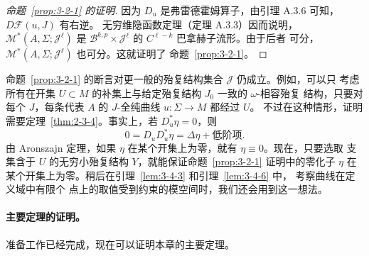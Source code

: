 \begin{proof}[命题~\ref{prop:3-2-1} 的证明]
因为 $D_u$ 是弗雷德霍姆算子，由引理 A.3.6 可知，$D\mathcal F(u,J)$ 有右逆。
无穷维隐函数定理（定理 A.3.3）因而说明，
$\mathcal M^*(A,\Sigma;\mathcal J^\ell)$ 是
$\mathcal B^{k,p}\times\mathcal J^\ell$ 的 $C^{\ell-k}$ 巴拿赫子流形。由于后者
可分，$\mathcal M^*(A,\Sigma;\mathcal J^\ell)$ 也可分。这就证明了
命题~\ref{prop:3-2-1}。
\end{proof}

\begin{remark}\label{rem:3-2-3}
命题~\ref{prop:3-2-1} 的断言对更一般的殆复结构集合 $\mathcal J$ 仍成立。例如，可以只
考虑所有在开集 $U\subset M$ 的补集上与给定殆复结构 $J_0$ 一致的 $\omega$-相容殆复
结构，只要对每个 $J$，每条代表 $A$ 的 $J$-全纯曲线 $u:\Sigma\to M$ 都经过 $U$。
不过在这种情形，证明需要定理~\ref{thm:2-3-4}。事实上，若 $D_u^*\eta=0$，则
\[
  0=D_uD_u^*\eta=\Delta\eta+\text{低阶项}.
\]
由 Aronszajn 定理，如果 $\eta$ 在某个开集上为零，就有 $\eta\equiv0$。现在，只要选取
支集含于 $U$ 的无穷小殆复结构 $Y$，就能保证命题~\ref{prop:3-2-1} 证明中的零化子
$\eta$ 在某个开集上为零。稍后在引理~\ref{lem:3-4-3} 和引理~\ref{lem:3-4-6} 中，
考察曲线在定义域中有限个
点上的取值受到约束的模空间时，我们还会用到这一想法。
\end{remark}

\paragraph{主要定理的证明。}
准备工作已经完成，现在可以证明本章的主要定理。

